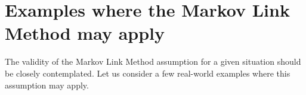 

\section{Examples where the Markov Link Method may apply}

\label{sec:examples}

The validity of the Markov Link Method assumption for a given situation should be closely contemplated.  Let us consider a few real-world examples where this assumption may apply.

